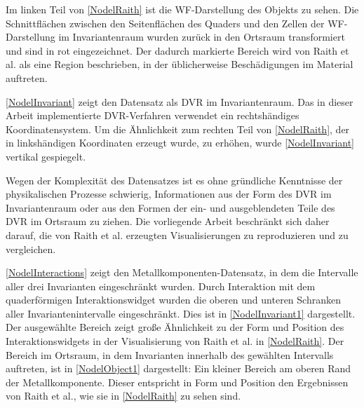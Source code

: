 \documentclass[a4paper,fontsize=12pt,toc=bib,parskip=half,ngerman]{scrartcl}
\begin{document}
Im linken Teil von \cref{NodelRaith} ist die WF-Darstellung des Objekts zu sehen. Die Schnittfl\"achen zwischen den Seitenfl\"achen des Quaders und den Zellen der WF-Darstellung im Invariantenraum wurden zur\"uck in den Ortsraum transformiert und sind in rot eingezeichnet. Der dadurch markierte Bereich wird von Raith et al. als eine Region beschrieben, in der \"ublicherweise Besch\"adigungen im Material auftreten.

\cref{NodelInvariant} zeigt den Datensatz als DVR im Invariantenraum. Das in dieser Arbeit implementierte DVR-Verfahren verwendet ein rechtsh\"andiges Koordinatensystem. Um die \"Ahnlichkeit zum rechten Teil von \cref{NodelRaith}, der in linksh\"andigen Koordinaten erzeugt wurde, zu erh\"ohen, wurde \cref{NodelInvariant} vertikal gespiegelt. 

Wegen der Komplexit\"at des Datensatzes ist es ohne gr\"undliche Kenntnisse der physikalischen Prozesse schwierig, Informationen aus der Form des DVR im Invariantenraum oder aus den Formen der ein- und ausgeblendeten Teile des DVR im Ortsraum zu ziehen. Die vorliegende Arbeit beschr\"ankt sich daher darauf, die von Raith et al. erzeugten Visualisierungen zu reproduzieren und zu vergleichen.

\cref{NodelInteractions} zeigt den Metallkomponenten-Datensatz, in dem die Intervalle aller drei Invarianten eingeschr\"ankt wurden. 
Durch Interaktion mit dem quaderf\"ormigen Interaktionswidget wurden die oberen und unteren Schranken aller Invariantenintervalle eingeschr\"ankt. Dies ist in \cref{NodelInvariant1} dargestellt. Der ausgew\"ahlte Bereich zeigt gro{\ss}e \"Ahnlichkeit zu der Form und Position des Interaktionswidgets in der Visualisierung von Raith et al. in \cref{NodelRaith}. Der Bereich im Ortsraum, in dem Invarianten innerhalb des gew\"ahlten Intervalls auftreten, ist in \cref{NodelObject1} dargestellt: Ein kleiner Bereich am oberen Rand der Metallkomponente. Dieser entspricht in Form und Position den Ergebnissen von Raith et al., wie sie in \cref{NodelRaith} zu sehen sind.
\end{document}
